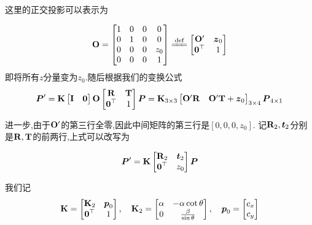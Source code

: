 这里的正交投影可以表示为

\begin{equation}
	\bd O = \begin{bmatrix}
		1 & 0 & 0 & 0
		\\
		0 & 1 & 0 & 0
		\\
		0 & 0 & 0 & z_0
		\\
		0 & 0 & 0 & 1
	\end{bmatrix} \xlongequal{\text{def}} 
	\begin{bmatrix}
		\bd O^\prime & \bm z_0
		\\
		\bm 0^\top & 1
	\end{bmatrix}
\end{equation}
即将所有$z$分量变为$z_0$.随后根据我们的变换公式
\begin{equation}
	\boldsymbol P^\prime = \bold{K} \begin{bmatrix}
		\bold{I} & \boldsymbol 0
	\end{bmatrix} \bold{O} 
	\begin{bmatrix}
		\bold{R} & \bold{T}
		\\
		\boldsymbol 0^\top & 1
	\end{bmatrix}
	\boldsymbol P
	= \bold{K}_{3\times 3} 
	\begin{bmatrix}
		\bold{O}^\prime \bold{R} & \bold{O}^\prime \bold{T} + \boldsymbol z_0
	\end{bmatrix}_{3\times 4} 
	\boldsymbol P_{4\times 1} 
\end{equation}

进一步,由于$\bold{O}^\prime$的第三行全零,因此中间矩阵的第三行是$[0, 0, 0, z_0]$.
记$\bold{R}_2, \boldsymbol t_2$分别是$\bold{R}, \bold{T}$的前两行,上式可以改写为

\begin{equation}
	\boldsymbol P^\prime = \bold{K} 
	\begin{bmatrix}
		\bold{R}_2 & \boldsymbol t_2
		\\
		\boldsymbol 0^\top & z_0
	\end{bmatrix}
	\boldsymbol P
\end{equation}

我们记
\begin{equation}
	\bold{K} = 
	\begin{bmatrix}
		\bold{K}_2 & \boldsymbol p_0
		\\
		\boldsymbol 0^\top & 1
	\end{bmatrix}, \quad 
	\bold{K}_2 = 
	\begin{bmatrix}
		\alpha & -\alpha \cot \theta
		\\
		0 & \frac{\beta}{\sin \theta}
	\end{bmatrix}, \quad
	\boldsymbol p_0 = 
	\begin{bmatrix}
		c_x 
		\\
		c_y
	\end{bmatrix}
\end{equation}

